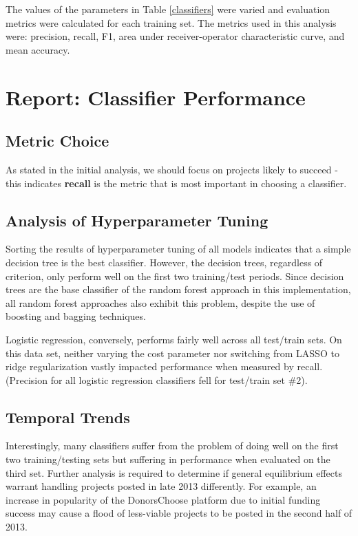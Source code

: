 \documentclass[11pt]{article}
\begin{document}
The values of the parameters in Table \ref{classifiers} were varied and evaluation metrics were calculated for each training set. The metrics used in this analysis were: precision, recall, F1, area under receiver-operator characteristic curve, and mean accuracy.

\section{Report: Classifier Performance}
\subsection{Metric Choice}
As stated in the initial analysis, we should focus on projects likely to succeed - this indicates \textbf{recall} is the metric that is most important in choosing a classifier.

\subsection{Analysis of Hyperparameter Tuning}
Sorting the results of hyperparameter tuning of all models indicates that a simple decision tree is the best classifier. However, the decision trees, regardless of criterion, only perform well on the first two training/test periods. Since decision trees are the base classifier of the random forest approach in this implementation, all random forest approaches also exhibit this problem, despite the use of boosting and bagging techniques.

Logistic regression, conversely, performs fairly well across all test/train sets. On this data set, neither varying the cost parameter nor switching from LASSO to ridge regularization vastly impacted performance when measured by recall. (Precision for all logistic regression classifiers fell for test/train set \#2).

\subsection{Temporal Trends}
Interestingly, many classifiers suffer from the problem of doing well on the first two training/testing sets but suffering in performance when evaluated on the third set. Further analysis is required to determine if general equilibrium effects warrant handling projects posted in late 2013 differently. For example, an increase in popularity of the DonorsChoose platform due to initial funding success may cause a flood of less-viable projects to be posted in the second half of 2013.
\end{document}
